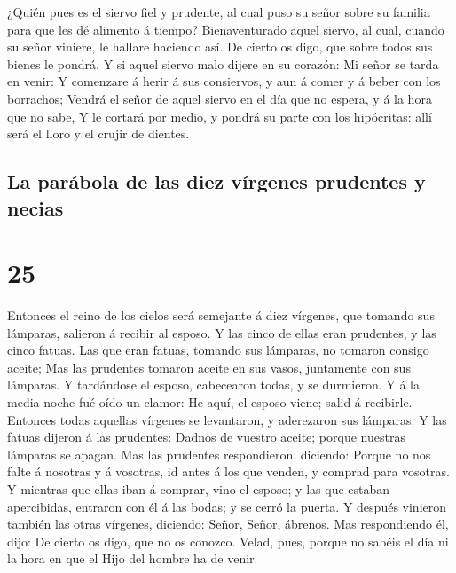  ¿Quién pues es el siervo fiel y prudente, al cual puso
su señor sobre su familia para que les dé alimento á tiempo?
 Bienaventurado aquel siervo, al cual, cuando su señor
viniere, le hallare haciendo así.  De cierto os digo, que
sobre todos sus bienes le pondrá.  Y si aquel siervo malo
dijere en su corazón: Mi señor se tarda en venir:  Y
comenzare á herir á sus consiervos, y aun á comer y á beber con los
borrachos;  Vendrá el señor de aquel siervo en el día que
no espera, y á la hora que no sabe,  Y le cortará por
medio, y pondrá su parte con los hipócritas: allí será el lloro y el
crujir de dientes.

\hypertarget{la-paruxe1bola-de-las-diez-vuxedrgenes-prudentes-y-necias}{%
\subsection{La parábola de las diez vírgenes prudentes y
necias}\label{la-paruxe1bola-de-las-diez-vuxedrgenes-prudentes-y-necias}}

\hypertarget{section-40-25}{%
\section{25}\label{section-40-25}}

 Entonces el reino de los cielos será semejante á diez
vírgenes, que tomando sus lámparas, salieron á recibir al esposo.
 Y las cinco de ellas eran prudentes, y las cinco fatuas.
 Las que eran fatuas, tomando sus lámparas, no tomaron
consigo aceite;  Mas las prudentes tomaron aceite en sus
vasos, juntamente con sus lámparas.  Y tardándose el
esposo, cabecearon todas, y se durmieron.  Y á la media
noche fué oído un clamor: He aquí, el esposo viene; salid á recibirle.
 Entonces todas aquellas vírgenes se levantaron, y
aderezaron sus lámparas.  Y las fatuas dijeron á las
prudentes: Dadnos de vuestro aceite; porque nuestras lámparas se apagan.
 Mas las prudentes respondieron, diciendo: Porque no nos
falte á nosotras y á vosotras, id antes á los que venden, y comprad para
vosotras.  Y mientras que ellas iban á comprar, vino el
esposo; y las que estaban apercibidas, entraron con él á las bodas; y se
cerró la puerta.  Y después vinieron también las otras
vírgenes, diciendo: Señor, Señor, ábrenos.  Mas
respondiendo él, dijo: De cierto os digo, que no os conozco.
 Velad, pues, porque no sabéis el día ni la hora en que
el Hijo del hombre ha de venir.

